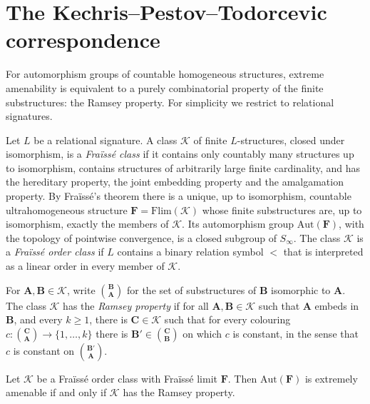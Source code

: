 \section{The Kechris--Pestov--Todorcevic correspondence}\label{sec:kpt}

For automorphism groups of countable homogeneous structures, extreme
amenability is equivalent to a purely combinatorial property of the finite
substructures: the Ramsey property. For simplicity we restrict to relational
signatures.

\begin{definition}\label{def:fraisse}
Let $L$ be a relational signature. A class $\mathcal{K}$ of finite
$L$-structures, closed under isomorphism, is a \emph{Fraïssé class} if it
contains only countably many structures up to isomorphism, contains structures
of arbitrarily large finite cardinality, and has the hereditary property, the
joint embedding property and the amalgamation property. By Fraïssé's theorem
there is a unique, up to isomorphism, countable ultrahomogeneous structure
$\mathbf{F}=\mathrm{Flim}(\mathcal{K})$ whose finite substructures are, up to
isomorphism, exactly the members of $\mathcal{K}$. Its automorphism group
$\mathrm{Aut}(\mathbf{F})$, with the topology of pointwise convergence, is a
closed subgroup of $S_\infty$. The class $\mathcal{K}$ is a \emph{Fraïssé order
class} if $L$ contains a binary relation symbol $<$ that is interpreted as a
linear order in every member of $\mathcal{K}$.
\end{definition}

\begin{definition}\label{def:ramsey}
For $\mathbf{A},\mathbf{B}\in\mathcal{K}$, write
$\binom{\mathbf{B}}{\mathbf{A}}$ for the set of substructures of $\mathbf{B}$
isomorphic to $\mathbf{A}$. The class $\mathcal{K}$ has the \emph{Ramsey
property} if for all $\mathbf{A},\mathbf{B}\in\mathcal{K}$ such that
$\mathbf{A}$ embeds in $\mathbf{B}$, and every $k\geq 1$, there is
$\mathbf{C}\in\mathcal{K}$ such that for every colouring
$c\colon\binom{\mathbf{C}}{\mathbf{A}}\to\{1,\dots,k\}$ there is
$\mathbf{B}'\in\binom{\mathbf{C}}{\mathbf{B}}$ on which $c$ is constant, in
the sense that $c$ is constant on $\binom{\mathbf{B}'}{\mathbf{A}}$.
\end{definition}

\begin{theorem}\label{thm:kpt}
Let $\mathcal{K}$ be a Fraïssé order class with Fraïssé limit $\mathbf{F}$.
Then $\mathrm{Aut}(\mathbf{F})$ is extremely amenable if and only if
$\mathcal{K}$ has the Ramsey property.
\end{theorem}

